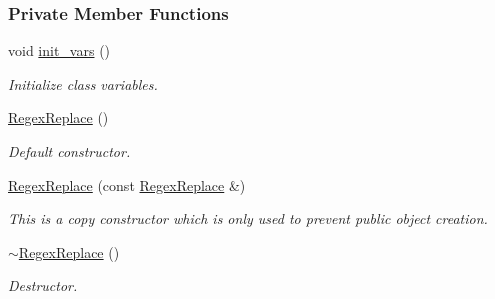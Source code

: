\subsubsection*{Private Member Functions}
\begin{DoxyCompactItemize}
\item 
\hypertarget{classjpcre2_1_1RegexReplace_a462810e8fc902f09e475a164e81cc5f5}{}\label{classjpcre2_1_1RegexReplace_a462810e8fc902f09e475a164e81cc5f5} 
void \hyperlink{classjpcre2_1_1RegexReplace_a462810e8fc902f09e475a164e81cc5f5}{init\+\_\+vars} ()
\begin{DoxyCompactList}\small\item\em Initialize class variables. \end{DoxyCompactList}\item 
\hyperlink{classjpcre2_1_1RegexReplace_ac50687b874800c827a6fa623b9b35753_ac50687b874800c827a6fa623b9b35753}{Regex\+Replace} ()
\begin{DoxyCompactList}\small\item\em Default constructor. \end{DoxyCompactList}\item 
\hyperlink{classjpcre2_1_1RegexReplace_a257d326d57af9ccbc7a45b002c34ed0a_a257d326d57af9ccbc7a45b002c34ed0a}{Regex\+Replace} (const \hyperlink{classjpcre2_1_1RegexReplace}{Regex\+Replace} \&)
\begin{DoxyCompactList}\small\item\em This is a copy constructor which is only used to prevent public object creation. \end{DoxyCompactList}\item 
\hyperlink{classjpcre2_1_1RegexReplace_ab27102839e7ff0914bcd204d750097ac_ab27102839e7ff0914bcd204d750097ac}{$\sim$\+Regex\+Replace} ()
\begin{DoxyCompactList}\small\item\em Destructor. \end{DoxyCompactList}\end{DoxyCompactItemize}
